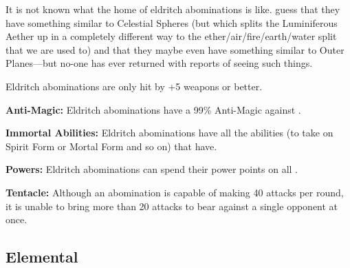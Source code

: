 \begin{multicols*}{2}
It is not known what the home of eldritch abominations is like.  guess that they have something similar to Celestial Spheres (but which splits the Luminiferous Aether up in a completely different way to the ether/air/fire/earth/water split that we are used to) and that they maybe even have something similar to Outer Planes—but no-one has ever returned with reports of seeing such things.

Eldritch abominations are only hit by +5 weapons or better.

\textbf{Anti-Magic:} Eldritch abominations have a 99\% Anti-Magic against .

\textbf{Immortal Abilities:} Eldritch abominations have all the abilities (to take on Spirit Form or Mortal Form and so on) that  have.

\textbf{Powers:} Eldritch abominations can spend their power points on all .

\textbf{Tentacle:} Although an abomination is capable of making 40 attacks per round, it is unable to bring more than 20 attacks to bear against a single opponent at once.

\subsection{Elemental}\label{sec:Elemental}
\end{multicols*}
